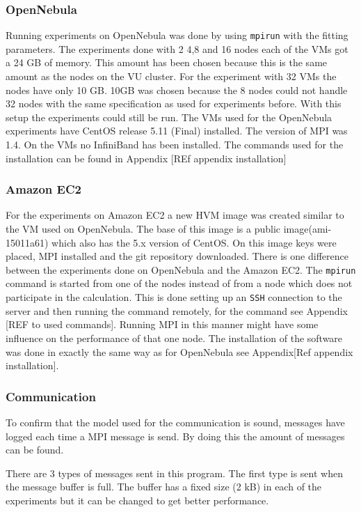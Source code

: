 \subsubsection*{OpenNebula}
Running experiments on OpenNebula was done by using \texttt{mpirun} with the fitting parameters. The experiments done with 2 4,8 and 16 nodes each of the VMs got a 24 GB of memory. This amount has been chosen because this is the same amount as the nodes on the VU cluster. For the experiment with 32 VMs the nodes have only 10 GB. 10GB was chosen because the 8 nodes could not handle 32 nodes with the same specification as used for experiments before. With this setup the experiments could still be run. The VMs used for the OpenNebula experiments have CentOS release 5.11 (Final) installed. The version of MPI was 1.4. On the VMs no InfiniBand has been installed. The commands used for the installation can be found in Appendix [REf appendix installation]

\subsubsection*{Amazon EC2}
For the experiments on Amazon EC2 a new HVM image was created similar to the VM used on OpenNebula. The base of this image is  a public image(ami-15011a61) which also has the 5.x version of CentOS. On this image keys were placed, MPI installed and the git repository downloaded. There is one difference between the experiments done on OpenNebula and the Amazon EC2. The \texttt{mpirun} command is started from one of the nodes instead of from a node which does not participate in the calculation. This is done setting up an \texttt{SSH} connection to the server and then running the command remotely, for the command see Appendix [REF to used commands]. Running MPI in this manner might have some influence on the performance of that one node. The installation of the software was done in exactly the same way as for OpenNebula see Appendix[Ref appendix installation].


\subsubsection{Communication}
\label{med:comm}
To confirm that the model used for the communication is sound, messages have logged each time a MPI message is send. By doing this the amount of messages can be found.

There are 3 types of messages sent in this program. The first type is sent when the message buffer is full. The buffer has a fixed size (2 kB) in each of the experiments but it can be changed to get better performance. 

